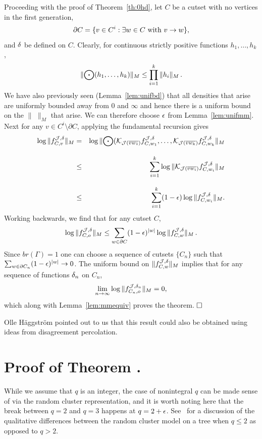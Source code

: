 Proceeding with the proof of Theorem~\ref{th:0hd}, let $C$ be a cutset
with no vertices in the first generation,
$$\partial C = \{ v \in C^i : \exists w \in C~{\rm with }\,\, v \to w \}, $$
and $\delta$ be defined on $C$. Clearly, for continuous strictly positive 
functions $h_1 , \ldots , h_k$,
$$
\| {\bigodot} (h_1 , \ldots , h_k) \|_M \leq \prod_{i=1}^k \| h_i \|_M \, .
$$
We have also previously seen (Lemma~\ref{lem:unifbd})
that all densities that arise are uniformly
bounded away from 0 and $\infty$ and hence there is a uniform bound on the
$\| \,\, \|_M $ that arise. We can therefore choose $\epsilon$ from
Lemma~\ref{lem:unifmm}. Next for any $v\in C^i\setminus \partial C$,
applying the fundamental recursion gives
\begin{eqnarray*}
\log \|f^{{\cal J} , \delta}_{C,v} \|_M & = & \log \| {\bigodot} ({\cal K}_{{\cal J} (\overline{vw_1})} 
   f^{{\cal J} , \delta}_{C , w_1} , \ldots , {\cal K}_{{\cal J} (\overline{vw_k})} 
   f^{{\cal J} , \delta}_{C , w_k} \|_M \\[2ex]
& \leq & \sum_{i=1}^k \log \| {\cal K}_{{\cal J} (\overline{vw_i})} 
   f^{{\cal J} , \delta}_{C , w_i} \|_M \\[2ex]
& \leq & \sum_{i=1}^k (1 - \epsilon) \log \| f^{{\cal J} , \delta}_{C , w_i} \|_M.
\end{eqnarray*}
Working backwards, we find that for any cutset $C$,
$$\log \|f^{{\cal J} , \delta}_{C , o}\|_M \leq \sum_{w \in \partial C}
   (1 - \epsilon)^{|w|} \log \|f^{{\cal J} , \delta}_{C , w}\|_M \, .$$
Since $\textstyle {br}  (\Gamma) = 1$ 
one can choose a sequence of cutsets $\{ C_n \}$
such that $\sum_{w \in \partial C_n} (1 - \epsilon)^{|w|} \rightarrow 0$.
The uniform bound on 
$\|f^{{\cal J} , \delta}_{C , w}\|_M$
implies that for any sequence of functions $\delta_n$ on $C_n$,
$$
\lim_{n\to\infty}\log \|f^{{\cal J} , \delta_n}_{C_n , o} \|_M =0,
$$
which along with Lemma~\ref{lem:mmequiv} proves the theorem.
$\qed$ 

Olle H\"aggstr\"om pointed out to us that this result could also be
obtained using ideas from disagreement percolation.

\setcounter{equation}{0}

\section{Proof of Theorem {\protect{\ref{th:2trees}}}.} \label{sec:potts}

While we assume that $q$ is an integer, the case of nonintegral $q$
can be made sense of via
the random cluster representation, and it is worth noting here that
the break between $q=2$ and $q=3$ happens at $q = 2 + \epsilon$.  
See~\cite{Ha} for a discussion of the qualitative differences between
the random cluster model on a tree when $q \leq 2$ as opposed to $q > 2$.

